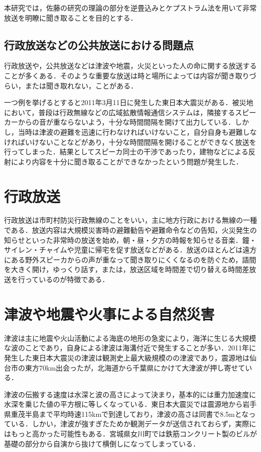\documentclass[a4j,11pt]{jsarticle}
\begin{document}
本研究では，佐藤\cite{oka2}の研究の理論の部分を逆畳込みとケプストラム法を用いて非常放送を明瞭に聞き取ることを目的とする．

\subsection{行政放送などの公共放送における問題点}
行政放送や，公共放送などは津波や地震，火災といった人の命に関する放送することが多くある．そのような重要な放送は時と場所によっては内容が聞き取りづらい，または聞き取れない，ことがある．

一つ例を挙げるとすると2011年3月11日に発生した東日本大震災がある．被災地において，普段は行政無線などの広域拡散情報通信システムは，隣接するスピーカーからの音が重ならないよう，十分な時間間隔を開けて出力している．しかし，当時は津波の避難を迅速に行わなければいけないこと，自分自身も避難しなければいけないことなどがあり，十分な時間間隔を開けることができなく放送を行ってしまった．結果としてスピーカ同士の干渉であったり，建物などによる反射により内容を十分に聞き取ることができなかったという問題が発生した．


\newpage

\section{行政放送}
行政放送は市町村防災行政無線のことをいい，主に地方行政における無線の一種である．放送内容は大規模災害時の避難勧告や避難命令などの告知，火災発生の知らせといった非常時の放送を始め，朝・昼・夕方の時報を知らせる音楽．鐘・サイレン・チャイムや児童に帰宅を促す放送などがある．放送のほとんどは遠方にある野外スピーカからの声が重なって聞き取りにくくなるのを防ぐため，語間を大きく開け，ゆっくり話す，または，放送区域を時間差で切り替える時間差放送を行っているのが特徴である．



\newpage

\section{津波や地震や火事による自然災害}
津波は主に地震や火山活動による海底の地形の急変により，海洋に生じる大規模な波のことであり，自身による津波は海溝付近で発生することが多い．2011年に発生した東日本大震災の津波は観測史上最大級規模のの津波であり，震源地は仙台市の東方70km出会ったが，北海道から千葉県にかけて大津波が押し寄せている．

津波の伝搬する速度は水深と波の高さによって決まり，基本的には重力加速度に水深を乗じた値の平方根に等しくなっている．東日本大震災では震源地から岩手県重茂半島まで平均時速115kmで到達しており，津波の高さは同書で8.5mとなっている．しかい，津波が強すぎたためか観測データが送信されておらず，実際にはもっと高かった可能性もある．宮城県女川町では鉄筋コンクリート製のビルが基礎の部分から自演から抜けて横倒しになってしまっている．
\end{document}
